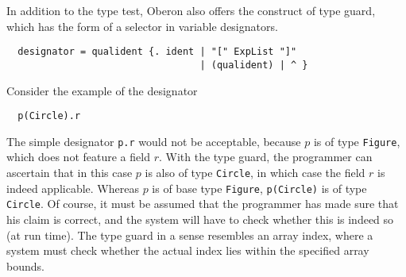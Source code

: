 In addition to the type test, Oberon also offers the construct of type guard, which has the form of
a selector in variable designators.
\begin{verbatim}
  designator = qualident {. ident | "[" ExpList "]"
                                  | (qualident) | ^ }
\end{verbatim}
Consider the example of the designator
\begin{verbatim}
  p(Circle).r
\end{verbatim}
The simple designator \verb|p.r| would not be acceptable, because $p$ is of type \verb|Figure|,
which does not feature a field $r$. With the type guard, the programmer can ascertain that in this
case $p$ is also of type \verb|Circle|, in which case the field $r$ is indeed applicable. Whereas
$p$ is of base type \verb|Figure|, \verb|p(Circle)| is of type \verb|Circle|. Of course, it must be
assumed that the programmer has made sure that his claim is correct, and the system will have to
check whether this is indeed so (at run time). The type guard in a sense resembles an array index,
where a system must check whether the actual index lies within the specified array bounds.

